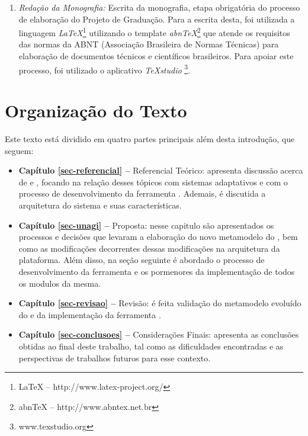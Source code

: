 \begin{enumerate}
	\item \textit{Redação da Monografia:} Escrita da monografia, etapa obrigatória do processo de elaboração do Projeto de Graduação. Para a escrita desta, foi utilizada a linguagem \textit{LaTeX}\footnote{LaTeX -- http://www.latex-project.org/} utilizando o template \textit{abnTeX}\footnote{abnTeX -- http://www.abntex.net.br} que atende os requisitos das normas da ABNT (Associação Brasileira de Normas Técnicas) para elaboração de documentos técnicos e científicos brasileiros. Para apoiar este processo, foi utilizado o aplicativo \textit{TeXstudio} \footnote{www.texstudio.org}.
	
\end{enumerate}


\section{Organização do Texto}
\label{sec-intro-organizacao}

Este texto está dividido em quatro partes principais além desta introdução, que seguem:

\begin{itemize}
	\item \textbf{Capítulo \ref{sec-referencial} --} Referencial Teórico: apresenta discussão acerca de \gore e \mdd,  focando na relação desses tópicos com sistemas adaptativos e com o processo de desenvolvimento da ferramenta \unagi. Ademais, é discutida a arquitetura do sistema \zanshin e suas características.
	
	\item \textbf{Capítulo \ref{sec-unagi} --} Proposta: nesse capitulo são apresentados os processos e decisões que levaram a elaboração do novo metamodelo do \zanshin, bem como as modificações decorrentes dessas modificações na arquitetura da plataforma. Além disso, na seção seguinte é abordado o processo de desenvolvimento da ferramenta \unagi e os pormenores da implementação de todos os modulos da mesma.
	
	\item \textbf{Capítulo \ref{sec-revisao} --} Revisão: é feita validação do metamodelo evoluído do \zanshin e da implementação da ferramenta \unagi.
	
	\item \textbf{Capítulo \ref{sec-conclusoes} --} Considerações Finais: apresenta as conclusões obtidas ao final deste trabalho, tal como as dificuldades encontradas e as perspectivas de trabalhos futuros para esse contexto.
\end{itemize}









